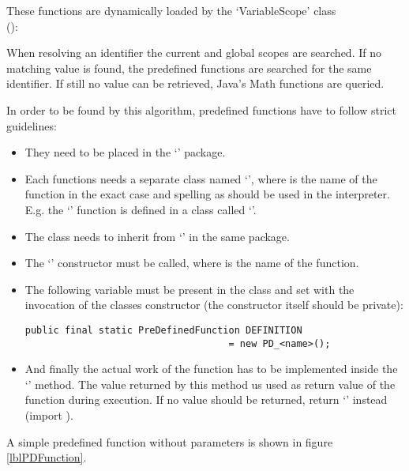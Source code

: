 These functions are dynamically loaded by the `VariableScope' class\\ ():

When resolving an identifier the current and global scopes are searched. If no matching value is found, the predefined functions are searched for the same identifier. If still no value can be retrieved, Java's Math functions are queried.

In order to be found by this algorithm, predefined functions have to follow strict guidelines:

\begin{itemize}
	\item They need to be placed in the `' package.
	\item Each functions needs a separate class named `', where  is the name of the function in the exact case and spelling as should be used in the interpreter.\\
		E.g. the `' function is defined in a class called `'.
	\item The class needs to inherit from `' in the same package.
	\item The `' constructor must be called, where  is the name of the function.
	\item The following variable must be present in the class and set with the invocation of the classes constructor (the constructor itself should be private):
\begin{lstlisting}[frame=none,numbers=none]
public final static PreDefinedFunction DEFINITION
                                    = new PD_<name>();
\end{lstlisting}
	\item And finally the actual work of the function has to be implemented inside the `' method. The value returned by this method us used as return value of the function during execution. If no value should be returned, return `' instead (import ).

\end{itemize}

A simple predefined function without parameters is shown in figure \ref{lblPDFunction}.


